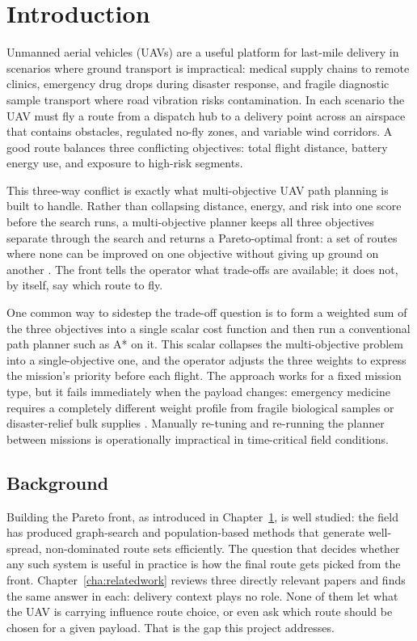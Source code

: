 \documentclass{ssnreview}
\begin{document}
\chapter{Introduction}\label{cha:intro}

Unmanned aerial vehicles (UAVs) are a useful platform for last-mile delivery in
scenarios where ground transport is impractical: medical supply chains to remote
clinics, emergency drug drops during disaster response, and fragile diagnostic sample
transport where road vibration risks contamination. In each scenario the UAV must
fly a route from a dispatch hub to a delivery point across an airspace that contains
obstacles, regulated no-fly zones, and variable wind corridors. A good route balances
three conflicting objectives: total flight distance, battery energy use, and exposure to
high-risk segments.

This three-way conflict is exactly what multi-objective UAV path planning is built to
handle. Rather than collapsing distance, energy, and risk into one score before the
search runs, a multi-objective planner keeps all three objectives separate through the
search and returns a Pareto-optimal front: a set of routes where none can be improved on
one objective without giving up ground on another \cite{r11}. The front tells the
operator what trade-offs are available; it does not, by itself, say which route to fly.

One common way to sidestep the trade-off question is to form a weighted sum of the
three objectives into a single scalar cost function and then run a conventional path
planner such as A* on it. This scalar collapses the multi-objective problem into a
single-objective one, and the operator adjusts the three weights to express the
mission's priority before each flight. The approach works for a fixed mission type, but
it fails immediately when the payload changes: emergency medicine requires a completely
different weight profile from fragile biological samples or disaster-relief bulk
supplies \cite{r1}. Manually re-tuning and re-running the planner between missions is
operationally impractical in time-critical field conditions.

\section{Background}

Building the Pareto front, as introduced in Chapter~\ref{cha:intro}, is well studied:
the field has produced graph-search and population-based methods that generate
well-spread, non-dominated route sets efficiently. The question that decides whether
any such system is useful in practice is how the
final route gets picked from the front. Chapter~\ref{cha:relatedwork} reviews three
directly relevant papers and finds the same answer in each: delivery context plays no
role. None of them let what the UAV is carrying influence route choice, or even ask
which route should be chosen for a given payload. That is the gap this project
addresses.
\end{document}
